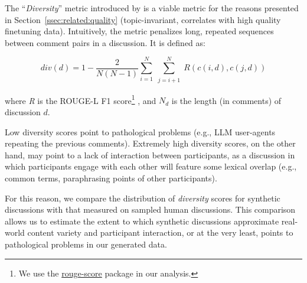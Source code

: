 The “\textit{Diversity}” metric introduced by \citet{ulmer2024} is a viable metric for the reasons presented in Section~\ref{ssec:related:quality} (topic-invariant, correlates with high quality finetuning data). Intuitively, the metric penalizes long, repeated sequences between comment pairs in a discussion. It is defined as:

\small
\begin{equation}
\label{eq:variety}
    \textit{div}(d) = 1 - \frac{2}{N(N-1)}
\sum_{i=1}^N \sum_{\substack{j=i+1}}^N R(c(i,d), c(j,d))
\end{equation}
\normalsize

\noindent where \textit{R} is the ROUGE-L F1 score\footnote{We use the \href{https://pypi.org/project/rouge-score}{rouge-score} package in our analysis.} \cite{lin-2004-rouge}, and $N_d$ is the length (in comments) of discussion $d$.

Low diversity scores point to pathological problems (e.g., \ac{LLM} user-agents repeating the previous comments). Extremely high diversity scores, on the other hand, may point to a lack of interaction between participants, as a discussion in which participants engage with each other will feature some lexical overlap (e.g., common terms, paraphrasing points of other participants).%

For this reason, we compare the distribution of \textit{diversity} scores for synthetic discussions with that measured on sampled human discussions. This comparison allows us to estimate the extent to which synthetic discussions approximate real-world content variety and participant interaction, or at the very least, points to pathological problems in our generated data.